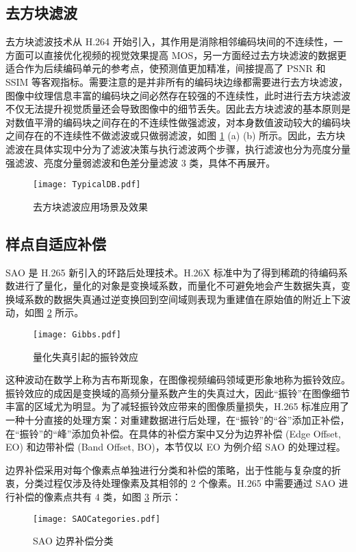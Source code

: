 \subsection{去方块滤波}
去方块滤波技术从 H.264 开始引入，其作用是消除相邻编码块间的不连续性，一方面可以直接优化视频的视觉效果提高 MOS，另一方面经过去方块滤波的数据更适合作为后续编码单元的参考点，使预测值更加精准，间接提高了 PSNR 和 SSIM 等客观指标。需要注意的是并非所有的编码块边缘都需要进行去方块滤波，图像中纹理信息丰富的编码块之间必然存在较强的不连续性，此时进行去方块滤波不仅无法提升视觉质量还会导致图像中的细节丢失。因此去方块滤波的基本原则是对数值平滑的编码块之间存在的不连续性做强滤波，对本身数值波动较大的编码块之间存在的不连续性不做滤波或只做弱滤波，如图 \ref{fig:TypicalDB} (a) (b) 所示。因此，去方块滤波在具体实现中分为了滤波决策与执行滤波两个步骤，执行滤波也分为亮度分量强滤波、亮度分量弱滤波和色差分量滤波 3 类，具体不再展开。
\begin{figure}[htb]
    \centering
    \texttt{[image: TypicalDB.pdf]}
    \caption{去方块滤波应用场景及效果}
    \label{fig:TypicalDB}
\end{figure}

\subsection{样点自适应补偿}
SAO 是 H.265 新引入的环路后处理技术。H.26X 标准中为了得到稀疏的待编码系数进行了量化，量化的对象是变换域系数，而量化不可避免地会产生数据失真，变换域系数的数据失真通过逆变换回到空间域则表现为重建值在原始值的附近上下波动，如图 \ref{fig:Gibbs} 所示。
\begin{figure}[htb]
    \centering
    \texttt{[image: Gibbs.pdf]}
    \caption{量化失真引起的振铃效应}
    \label{fig:Gibbs}
\end{figure}

这种波动在数学上称为吉布斯现象，在图像视频编码领域更形象地称为振铃效应。振铃效应的成因是变换域的高频分量系数产生的失真过大，因此“振铃”在图像细节丰富的区域尤为明显。为了减轻振铃效应带来的图像质量损失，H.265 标准应用了一种十分直接的处理方案：对重建数据进行后处理，在“振铃”的“谷”添加正补偿，在“振铃”的“峰”添加负补偿。在具体的补偿方案中又分为边界补偿 (Edge Offset, EO) 和边带补偿 (Band Offset, BO)，本节仅以 EO 为例介绍 SAO 的处理过程。

边界补偿采用对每个像素点单独进行分类和补偿的策略，出于性能与复杂度的折衷，分类过程仅涉及待处理像素及其相邻的 2 个像素。H.265 中需要通过 SAO 进行补偿的像素点共有 4 类，如图 \ref{fig:SAOCategories} 所示：
\begin{figure}[htb]
    \centering
    \texttt{[image: SAOCategories.pdf]}
    \caption{SAO 边界补偿分类}
    \label{fig:SAOCategories}
\end{figure}

